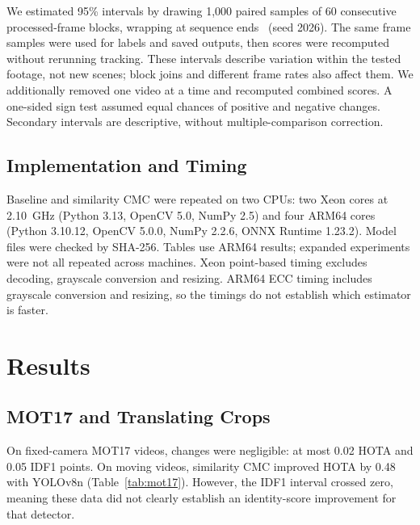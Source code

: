 \documentclass[conference]{IEEEtran}
\begin{document}
We estimated 95\% intervals by drawing 1,000 paired samples of 60 consecutive processed-frame blocks, wrapping at sequence ends~\cite{kunsch1989bootstrap} (seed 2026). The same frame samples were used for labels and saved outputs, then scores were recomputed without rerunning tracking. These intervals describe variation within the tested footage, not new scenes; block joins and different frame rates also affect them. We additionally removed one video at a time and recomputed combined scores. A one-sided sign test assumed equal chances of positive and negative changes. Secondary intervals are descriptive, without multiple-comparison correction.

\subsection{Implementation and Timing}
Baseline and similarity CMC were repeated on two CPUs: two Xeon cores at 2.10~GHz (Python 3.13, OpenCV 5.0, NumPy 2.5) and four ARM64 cores (Python 3.10.12, OpenCV 5.0.0, NumPy 2.2.6, ONNX Runtime 1.23.2). Model files were checked by SHA-256. Tables use ARM64 results; expanded experiments were not all repeated across machines. Xeon point-based timing excludes decoding, grayscale conversion and resizing. ARM64 ECC timing includes grayscale conversion and resizing, so the timings do not establish which estimator is faster.

\section{Results}
\subsection{MOT17 and Translating Crops}
On fixed-camera MOT17 videos, changes were negligible: at most 0.02 HOTA and 0.05 IDF1 points. On moving videos, similarity CMC improved HOTA by 0.48 with YOLOv8n (Table~\ref{tab:mot17}). However, the IDF1 interval crossed zero, meaning these data did not clearly establish an identity-score improvement for that detector.
\end{document}
